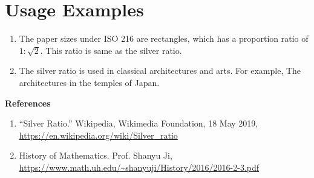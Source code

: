 \documentclass[letterpaper]{article}
\begin{document}
\section{Usage Examples}
\begin{enumerate}
  \item The paper sizes under ISO 216 are rectangles, which has a proportion ratio of \( 1:\sqrt{2} \). This ratio is same as the silver ratio.
  \item The silver ratio is used in classical architectures and arts. For example, The architectures in the temples of Japan. \\
\end{enumerate}


\textbf{References} 
\begin{enumerate}
 \item “Silver Ratio.” Wikipedia, Wikimedia Foundation, 18 May 2019, \url{https://en.wikipedia.org/wiki/Silver_ratio}
 \item History of Mathematics. Prof. Shanyu Ji, \url{https://www.math.uh.edu/~shanyuji/History/2016/2016-2-3.pdf}
\end{enumerate}
\end{document}
